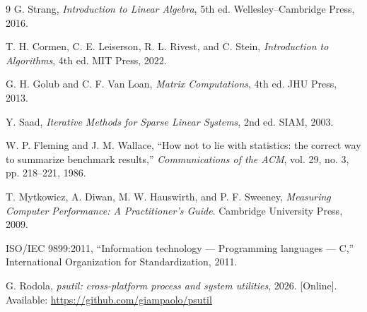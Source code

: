 \documentclass[11pt,a4paper]{article}
\begin{document}
\begin{thebibliography}{9}
G. Strang, \emph{Introduction to Linear Algebra}, 5th ed.
Wellesley--Cambridge Press, 2016.

T. H. Cormen, C. E. Leiserson, R. L. Rivest, and C. Stein,
\emph{Introduction to Algorithms}, 4th ed. MIT Press, 2022.

G. H. Golub and C. F. Van Loan, \emph{Matrix Computations}, 4th ed.
JHU Press, 2013.

Y. Saad, \emph{Iterative Methods for Sparse Linear Systems}, 2nd ed.
SIAM, 2003.

W. P. Fleming and J. M. Wallace, ``How not to lie with statistics: the correct
way to summarize benchmark results,'' \emph{Communications of the ACM},
vol. 29, no. 3, pp. 218--221, 1986.

T. Mytkowicz, A. Diwan, M. W. Hauswirth, and P. F. Sweeney,
\emph{Measuring Computer Performance: A Practitioner's Guide}.
Cambridge University Press, 2009.

ISO/IEC 9899:2011, ``Information technology --- Programming languages --- C,''
International Organization for Standardization, 2011.

G. Rodola, \emph{psutil: cross-platform process and system utilities}, 2026.
[Online]. Available: \url{https://github.com/giampaolo/psutil}
\end{thebibliography}
\end{document}
